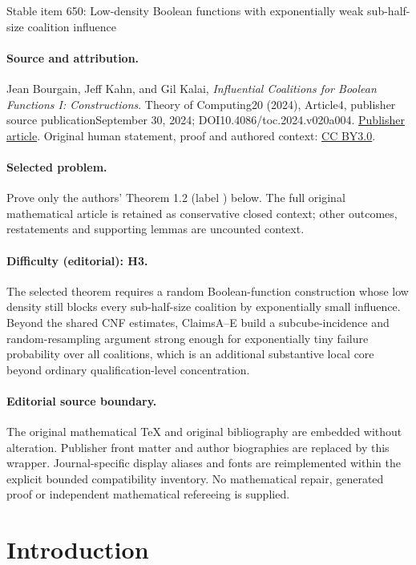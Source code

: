 \documentclass[11pt]{article}
\numberwithin{equation}{section}
\theoremstyle{definition}
\theoremstyle{plain}
\newcommand{\0}[0]{\emptyset}
\begin{document}
\begin{center}{\Large Stable item 650: Low-density Boolean functions with exponentially weak sub-half-size coalition influence}\end{center}
\paragraph{Source and attribution.}
Jean Bourgain, Jeff Kahn, and Gil Kalai, \emph{Influential Coalitions for Boolean Functions I: Constructions}. Theory of Computing20 (2024), Article4, publisher source publicationSeptember 30, 2024; DOI10.4086/toc.2024.v020a004. \href{https://theoryofcomputing.org/articles/v020a004/}{Publisher article}. Original human statement, proof and authored context: \href{https://creativecommons.org/licenses/by/3.0/}{CC BY3.0}.
\paragraph{Selected problem.}
Prove only the authors' Theorem 1.2 (label ) below. The full original mathematical article is retained as conservative closed context; other outcomes, restatements and supporting lemmas are uncounted context.
\paragraph{Difficulty (editorial): H3.}
The selected theorem requires a random Boolean-function construction whose low density still blocks every sub-half-size coalition by exponentially small influence. Beyond the shared CNF estimates, ClaimsA–E build a subcube-incidence and random-resampling argument strong enough for exponentially tiny failure probability over all coalitions, which is an additional substantive local core beyond ordinary qualification-level concentration.
\paragraph{Editorial source boundary.}
The original mathematical TeX and original bibliography are embedded without alteration. Publisher front matter and author biographies are replaced by this wrapper. Journal-specific display aliases and fonts are reimplemented within the explicit bounded compatibility inventory. No mathematical repair, generated proof or independent mathematical refereeing is supplied.
\clearpage

%
%
%


\section {Introduction}\label{Intro}
\end{document}
